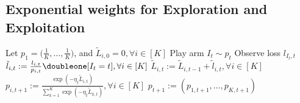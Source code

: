 \subsection{Exponential weights for Exploration and Exploitation} %

\begin{alg}[Exp3] \leavevmode
    \begin{framed}
        \begin{algorithmic}
            \State Let $p_1=\big(\frac{1}{K},\dots,\frac{1}{K}\big)$,
                and $\tilde L_{i,0}=0, \forall i\in [K]$
                \State Play arm $I_t\sim p_t$
                \State Observe loss $l_{I_t, t}$
                \State $\tilde l_{i,t}:=\frac{l_{i,t}}{p_{i,t}}\doubleone[I_t=t], \forall i\in[K]$
                \State $\tilde L_{i,t} := \tilde L_{i,t-1} + \tilde l_{i,t}, \forall i\in[K]$
                \State $p_{i,t+1}:=\frac{\exp(-\eta_t\tilde L_{i,t})}{\sum_{k=1}^K \exp(-\eta_t\tilde L_{k,t})}, \forall i\in[K]$
                \State $p_{t+1} := (p_{1,t+1},\dots,p_{K,t+1})$
            \EndFor
        \end{algorithmic}
    \end{framed}
\end{alg}


